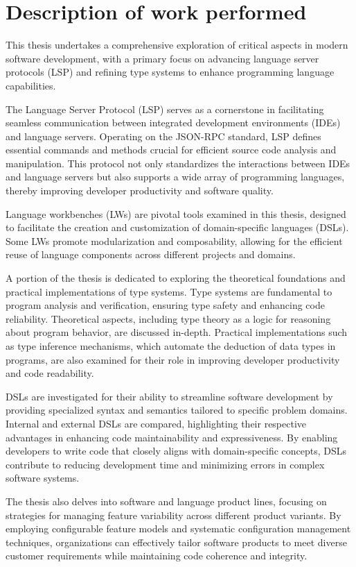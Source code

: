 \documentclass{adapt-lab}
\begin{document}
\section{Description of work performed}

This thesis undertakes a comprehensive exploration of critical aspects in modern software development, with a primary focus on advancing language server protocols (LSP) and refining type systems to enhance programming language capabilities.

The Language Server Protocol (LSP) serves as a cornerstone in facilitating seamless communication between integrated development environments (IDEs) and language servers. Operating on the JSON-RPC standard, LSP defines essential commands and methods crucial for efficient source code analysis and manipulation. This protocol not only standardizes the interactions between IDEs and language servers but also supports a wide array of programming languages, thereby improving developer productivity and software quality.

Language workbenches (LWs) are pivotal tools examined in this thesis, designed to facilitate the creation and customization of domain-specific languages (DSLs). Some LWs promote modularization and composability, allowing for the efficient reuse of language components across different projects and domains.

A portion of the thesis is dedicated to exploring the theoretical foundations and practical implementations of type systems. Type systems are fundamental to program analysis and verification, ensuring type safety and enhancing code reliability. Theoretical aspects, including type theory as a logic for reasoning about program behavior, are discussed in-depth. Practical implementations such as type inference mechanisms, which automate the deduction of data types in programs, are also examined for their role in improving developer productivity and code readability.

DSLs are investigated for their ability to streamline software development by providing specialized syntax and semantics tailored to specific problem domains. Internal and external DSLs are compared, highlighting their respective advantages in enhancing code maintainability and expressiveness. By enabling developers to write code that closely aligns with domain-specific concepts, DSLs contribute to reducing development time and minimizing errors in complex software systems.

The thesis also delves into software and language product lines, focusing on strategies for managing feature variability across different product variants. By employing configurable feature models and systematic configuration management techniques, organizations can effectively tailor software products to meet diverse customer requirements while maintaining code coherence and integrity.
\end{document}
